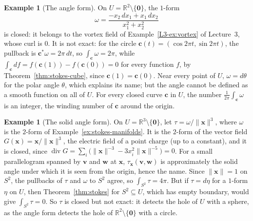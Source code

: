 \documentclass[11pt]{article}
\newcommand{\norm}[1]{\lVert #1 \rVert}
\theoremstyle{definition}
\newtheorem{example}[definition]{Example}
\theoremstyle{plain}
\theoremstyle{remark}
\DeclareMathOperator{\Div}{div}
\begin{document}
\begin{example}[The angle form]\label{ex:angle-form}
    On $U = \mathbb{R}^2 \setminus \{\mathbf{0}\}$, the $1$-form
    \[\omega = \frac{-x_2\, dx_1 + x_1\, dx_2}{x_1^2 + x_2^2}\]
    is closed: it belongs to the vortex field of Example~\ref{L3-ex:vortex} of Lecture~3, whose curl is $0$. It is not exact: for the circle $\mathbf{c}(t) = (\cos 2\pi t, \sin 2\pi t)$, the pullback is $\mathbf{c}^*\omega = 2\pi\, dt$, so $\int_{\mathbf{c}} \omega = 2\pi$, while $\int_{\mathbf{c}} df = f(\mathbf{c}(1)) - f(\mathbf{c}(0)) = 0$ for every function $f$, by Theorem~\ref{thm:stokes-cube}, since $\mathbf{c}(1) = \mathbf{c}(0)$. Near every point of $U$, $\omega = d\theta$ for the polar angle $\theta$, which explains its name; but the angle cannot be defined as a smooth function on all of $U$. For every closed curve $\mathbf{c}$ in $U$, the number $\frac{1}{2\pi}\int_{\mathbf{c}} \omega$ is an integer, the winding number of $\mathbf{c}$ around the origin.
\end{example}

\begin{example}[The solid angle form]\label{ex:solid-angle}
    On $U = \mathbb{R}^3 \setminus \{\mathbf{0}\}$, let $\tau = \omega/\norm{\mathbf{x}}^3$, where $\omega$ is the $2$-form of Example~\ref{ex:stokes-manifolds}. It is the $2$-form of the vector field $G(\mathbf{x}) = \mathbf{x}/\norm{\mathbf{x}}^3$, the electric field of a point charge (up to a constant), and it is closed, since $\Div G = \sum_i \big(\norm{\mathbf{x}}^{-3} - 3x_i^2\norm{\mathbf{x}}^{-5}\big) = 0$. For a small parallelogram spanned by $\mathbf{v}$ and $\mathbf{w}$ at $\mathbf{x}$, $\tau_{\mathbf{x}}(\mathbf{v}, \mathbf{w})$ is approximately the solid angle under which it is seen from the origin, hence the name. Since $\norm{\mathbf{x}} = 1$ on $S^2$, the pullbacks of $\tau$ and $\omega$ to $S^2$ agree, so $\int_{S^2} \tau = 4\pi$. But if $\tau = d\eta$ for a $1$-form $\eta$ on $U$, then Theorem~\ref{thm:stokes} for $S^2 \subseteq U$, which has empty boundary, would give $\int_{S^2} \tau = 0$. So $\tau$ is closed but not exact: it detects the hole of $U$ with a sphere, as the angle form detects the hole of $\mathbb{R}^2 \setminus \{\mathbf{0}\}$ with a circle.
\end{example}
\end{document}
